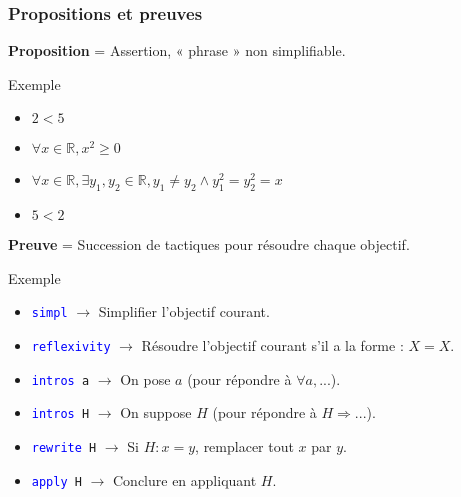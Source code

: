 \documentclass[9pt]{beamer}
\newenvironment{ex}[1][Exemple]{\begin{exampleblock}{#1}}{\end{exampleblock}}
\newcommand{\coq}[1]{\texttt{\textcolor{blue}{#1}}}
\newcommand{\defi}[1]{\textbf{#1}}
\newcommand{\R}{\mathbb{R}}
\begin{document}
\begin{frame}[c]
\frametitle{Propositions et preuves}

\defi{Proposition} = Assertion, « phrase » non simplifiable.
\begin{ex}
\begin{itemize}
  \item $2 < 5$
  \item $\forall x \in \R, x^2 \geq 0$
  \item $\forall x \in \R, \exists y_1, y_2 \in \R, y_1 \not= y_2 \wedge y_1^2 = y_2^2 = x$
  \item $5 < 2$
\end{itemize}
\end{ex}

\pause
\bigskip
\defi{Preuve} = Succession de tactiques pour résoudre chaque objectif.
\begin{ex}
\begin{itemize}
  \item \coq{simpl} $\rightarrow$ Simplifier l'objectif courant.
  \item \coq{reflexivity} $\rightarrow$ Résoudre l'objectif courant s'il a la forme : $X = X$.
  \item \coq{intros}\texttt{ a} $\rightarrow$ On pose $a$ (pour répondre à $\forall a, ...$).
  \item \coq{intros}\texttt{ H} $\rightarrow$ On suppose $H$ (pour répondre à $H \Rightarrow ...$).
  \item \coq{rewrite}\texttt{ H} $\rightarrow$ Si $H: x = y$, remplacer tout $x$ par $y$.
  \item \coq{apply}\texttt{ H} $\rightarrow$ Conclure en appliquant $H$.
\end{itemize}
\end{ex}

\end{frame}
\end{document}
